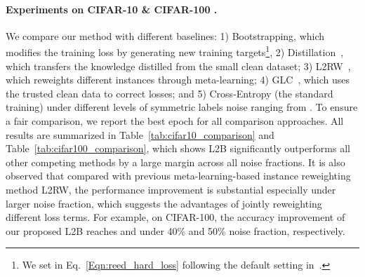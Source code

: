 \documentclass{article}
\begin{document}
\paragraph{Experiments on CIFAR-10 \& CIFAR-100 .} We compare our method with different baselines: 1) Bootstrapping, which modifies the training loss by generating new training targets\footnote{We set  in Eq.~\eqref{Eqn:reed_hard_loss} following the default setting in~\cite{reed2014training}.}, 2) Distillation~\cite{li2017learning}, which transfers the knowledge distilled from the small clean dataset; 3) L2RW~\cite{ren2018learning}, which reweights different instances through meta-learning; 4) GLC~\cite{hendrycks2018using}, which uses the trusted clean data  to correct losses; and 5) Cross-Entropy (the standard training) under different levels of symmetric labels noise ranging from .
To ensure a fair comparison, we report the best epoch for all comparison approaches.
All results are summarized in Table~\ref{tab:cifar10_comparison} and Table~\ref{tab:cifar100_comparison}, which shows L2B significantly outperforms all other competing methods by a large margin across all noise fractions.
It is also observed that compared with previous meta-learning-based instance reweighting method L2RW, the performance improvement is substantial especially under larger noise fraction, which suggests the advantages of jointly reweighting different loss terms.
For example, on CIFAR-100, the accuracy improvement of our proposed L2B reaches  and  under 40\% and 50\% noise fraction, respectively. 
\end{document}

